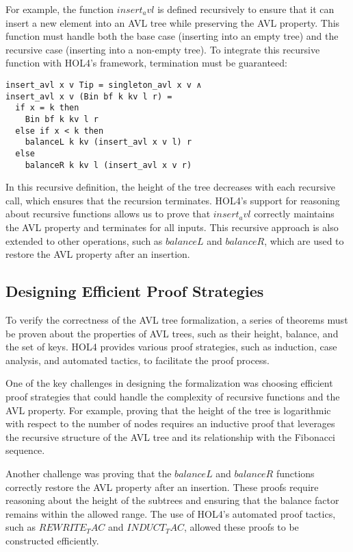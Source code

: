 \documentclass[12pt]{article}
\begin{document}
For example, the function \(insert_avl\) is defined recursively to ensure that it can insert a new element into an AVL tree while preserving the AVL property. This function must handle both the base case (inserting into an empty tree) and the recursive case (inserting into a non-empty tree). To integrate this recursive function with HOL4’s framework, termination must be guaranteed:

\begin{verbatim}
insert_avl x v Tip = singleton_avl x v ∧  
insert_avl x v (Bin bf k kv l r) =
  if x = k then
    Bin bf k kv l r  
  else if x < k then
    balanceL k kv (insert_avl x v l) r  
  else
    balanceR k kv l (insert_avl x v r)
\end{verbatim}

In this recursive definition, the height of the tree decreases with each recursive call, which ensures that the recursion terminates. HOL4’s support for reasoning about recursive functions allows us to prove that \(insert_avl\) correctly maintains the AVL property and terminates for all inputs. This recursive approach is also extended to other operations, such as \(balanceL\) and \(balanceR\), which are used to restore the AVL property after an insertion.

\subsection{Designing Efficient Proof Strategies}

To verify the correctness of the AVL tree formalization, a series of theorems must be proven about the properties of AVL trees, such as their height, balance, and the set of keys. HOL4 provides various proof strategies, such as induction, case analysis, and automated tactics, to facilitate the proof process.

One of the key challenges in designing the formalization was choosing efficient proof strategies that could handle the complexity of recursive functions and the AVL property. For example, proving that the height of the tree is logarithmic with respect to the number of nodes requires an inductive proof that leverages the recursive structure of the AVL tree and its relationship with the Fibonacci sequence.

Another challenge was proving that the \(balanceL\) and \(balanceR\) functions correctly restore the AVL property after an insertion. These proofs require reasoning about the height of the subtrees and ensuring that the balance factor remains within the allowed range. The use of HOL4’s automated proof tactics, such as \(REWRITE_TAC\) and \(INDUCT_TAC\), allowed these proofs to be constructed efficiently.
\end{document}
